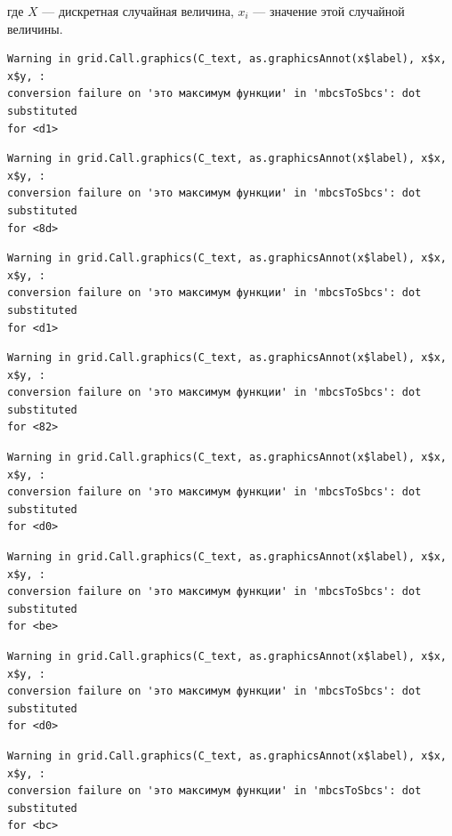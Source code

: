 \documentclass[
  letterpaper,
]{scrbook}
\theoremstyle{definition}
\theoremstyle{remark}
\begin{document}
где \(X\) --- дискретная случайная величина, \(x_i\) --- значение этой
случайной величины.

\begin{verbatim}
Warning in grid.Call.graphics(C_text, as.graphicsAnnot(x$label), x$x, x$y, :
conversion failure on 'это максимум функции' in 'mbcsToSbcs': dot substituted
for <d1>
\end{verbatim}

\begin{verbatim}
Warning in grid.Call.graphics(C_text, as.graphicsAnnot(x$label), x$x, x$y, :
conversion failure on 'это максимум функции' in 'mbcsToSbcs': dot substituted
for <8d>
\end{verbatim}

\begin{verbatim}
Warning in grid.Call.graphics(C_text, as.graphicsAnnot(x$label), x$x, x$y, :
conversion failure on 'это максимум функции' in 'mbcsToSbcs': dot substituted
for <d1>
\end{verbatim}

\begin{verbatim}
Warning in grid.Call.graphics(C_text, as.graphicsAnnot(x$label), x$x, x$y, :
conversion failure on 'это максимум функции' in 'mbcsToSbcs': dot substituted
for <82>
\end{verbatim}

\begin{verbatim}
Warning in grid.Call.graphics(C_text, as.graphicsAnnot(x$label), x$x, x$y, :
conversion failure on 'это максимум функции' in 'mbcsToSbcs': dot substituted
for <d0>
\end{verbatim}

\begin{verbatim}
Warning in grid.Call.graphics(C_text, as.graphicsAnnot(x$label), x$x, x$y, :
conversion failure on 'это максимум функции' in 'mbcsToSbcs': dot substituted
for <be>
\end{verbatim}

\begin{verbatim}
Warning in grid.Call.graphics(C_text, as.graphicsAnnot(x$label), x$x, x$y, :
conversion failure on 'это максимум функции' in 'mbcsToSbcs': dot substituted
for <d0>
\end{verbatim}

\begin{verbatim}
Warning in grid.Call.graphics(C_text, as.graphicsAnnot(x$label), x$x, x$y, :
conversion failure on 'это максимум функции' in 'mbcsToSbcs': dot substituted
for <bc>
\end{verbatim}
\end{document}
